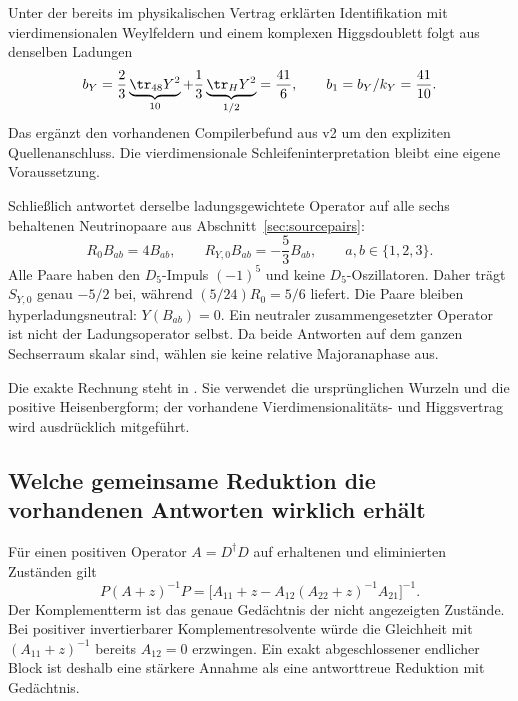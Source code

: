 Unter der bereits im physikalischen Vertrag erklärten Identifikation mit
vierdimensionalen Weylfeldern und einem komplexen Higgsdoublett folgt aus denselben Ladungen
\[
 b_Y=\frac23\underbrace{\tr_{48}Y^2}_{10}
       +\frac13\underbrace{\tr_HY^2}_{1/2}=\frac{41}{6},
 \qquad b_1=b_Y/k_Y=\frac{41}{10}.
\]
Das ergänzt den vorhandenen Compilerbefund aus v2 um den expliziten Quellenanschluss.
Die vierdimensionale Schleifeninterpretation bleibt eine eigene Voraussetzung.

Schließlich antwortet derselbe ladungsgewichtete Operator auf alle sechs behaltenen
Neutrinopaare aus Abschnitt~\ref{sec:sourcepairs}:
\begin{equation}\label{eq:twojointpairresponses}
 R_0B_{ab}=4B_{ab},\qquad
 R_{Y,0}B_{ab}=-\frac53 B_{ab},\qquad a,b\in\{1,2,3\}.
\end{equation}
Alle Paare haben den $D_5$-Impuls $(-1)^5$ und keine $D_5$-Oszillatoren.
Daher trägt $S_{Y,0}$ genau $-5/2$ bei, während $(5/24)R_0=5/6$ liefert.
Die Paare bleiben hyperladungsneutral: $Y(B_{ab})=0$. Ein neutraler zusammengesetzter
Operator ist nicht der Ladungsoperator selbst. Da beide Antworten auf dem ganzen
Sechserraum skalar sind, wählen sie keine relative Majoranaphase aus.


Die exakte Rechnung steht in .
Sie verwendet die ursprünglichen Wurzeln und die positive Heisenbergform; der
vorhandene Vierdimensionalitäts- und Higgsvertrag wird ausdrücklich mitgeführt.

\subsection{Welche gemeinsame Reduktion die vorhandenen Antworten wirklich erhält}
Für einen positiven Operator $A=D^\dagger D$ auf erhaltenen und eliminierten Zuständen gilt
\begin{equation}\label{eq:fullsourceschur}
P(A+z)^{-1}P
=\bigl[A_{11}+z-A_{12}(A_{22}+z)^{-1}A_{21}\bigr]^{-1}.
\end{equation}
Der Komplementterm ist das genaue Gedächtnis der nicht angezeigten Zustände. Bei positiver invertierbarer Komplementresolvente würde die Gleichheit mit $(A_{11}+z)^{-1}$ bereits $A_{12}=0$ erzwingen. Ein exakt abgeschlossener endlicher Block ist deshalb eine stärkere Annahme als eine antworttreue Reduktion mit Gedächtnis.


